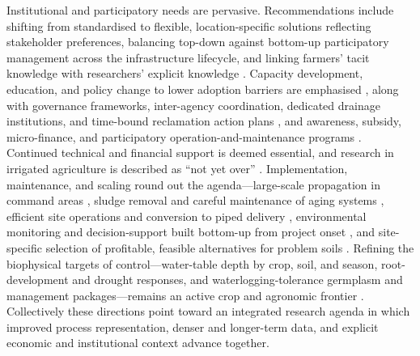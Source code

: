 Institutional and participatory needs are pervasive. Recommendations include
shifting from standardised to flexible, location-specific solutions reflecting
stakeholder preferences, balancing top-down against bottom-up participatory
management across the infrastructure lifecycle, and linking farmers' tacit
knowledge with researchers' explicit knowledge
\parencite{Ritzema2011,Ritzema2016,Ritzema2023}. Capacity development, education,
and policy change to lower adoption barriers are emphasised
\parencite{Ritzema2016,Castellano2019,SHIRMOHAMMADI1995,Kesicka2023b}, along with
governance frameworks, inter-agency coordination, dedicated drainage institutions,
and time-bound reclamation action plans
\parencite{Singh2019c,Qureshi2008,Gopalakrishnan2007,Ritzema2008b,Valipour2014,Quinn2009},
and awareness, subsidy, micro-finance, and participatory operation-and-maintenance
programs \parencite{Satyanarayana2007,Manjunatha2004,BenAissa2013,MCFARLANE1992}.
Continued technical and financial support is deemed essential, and research in
irrigated agriculture is described as ``not yet over''
\parencite{Qureshi2008,Ritzema2007,TeKrony2004}. Implementation, maintenance, and
scaling round out the agenda---large-scale propagation in command areas
\parencite{Karegoudar2019}, sludge removal and careful maintenance of aging
systems \parencite{Yan2013b,AbdElMageed2009,Lamsodis2011}, efficient site
operations and conversion to piped delivery \parencite{Kanber2019}, environmental
monitoring and decision-support built bottom-up from project onset
\parencite{Quinn2009,Gopalakrishnan2007}, and site-specific selection of
profitable, feasible alternatives for problem soils
\parencite{MOSTAGHIMI1989,Sharma1998,Muirhead1996,Guedessou2021,Imran2021,DarziNaftchali2017,HARRIS1993,CAMP1982}.
Refining the biophysical targets of control---water-table depth by crop, soil, and
season, root-development and drought responses, and waterlogging-tolerance
germplasm and management packages---remains an active crop and agronomic frontier
\parencite{Christen2001b,Nash2015b,Chen2021,Manik2019,Qureshi2008,Sarwar2001,Ritzema2008b,Khorramian2022,Gul2013,Steppuhn2017}.
Collectively these directions point toward an integrated research agenda in which
improved process representation, denser and longer-term data, and explicit economic
and institutional context advance together.